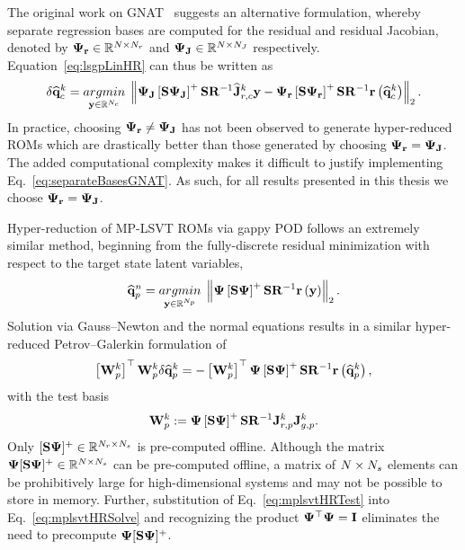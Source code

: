 %
The original work on GNAT~\cite{Carlberg2013} suggests an alternative formulation, whereby separate regression bases are computed for the residual and residual Jacobian, denoted by $\deimBasisRes \inRTwo{\numDOF}{\numResModes}$ and $\deimBasisJacob \inRTwo{\numDOF}{\numJacobModes}$ respectively. Equation~\ref{eq:lsgpLinHR} can thus be written as
%
\begin{equation}\label{eq:separateBasesGNAT}
    \delta \consVecCoef^{\newtonIdx} = \argmin{\dummyVec \inROne{\numConsModes}} \left\Vert \deimBasisJacob \left[ \sampMat \deimBasisJacob \right]^{+} \sampMat \resScaleInv \jacobResCoefCons^{\newtonIdx} \dummyVec - \deimBasisRes \left[ \sampMat \deimBasisRes \right]^{+} \sampMat \resScaleInv \resFunc{\consVecCoef^{\newtonIdx}} \right\Vert_2.
\end{equation}
%
In practice, choosing $\deimBasisRes \neq \deimBasisJacob$ has not been observed to generate hyper-reduced ROMs which are drastically better than those generated by choosing $\deimBasisRes = \deimBasisJacob$. The added computational complexity makes it difficult to justify implementing Eq.~\ref{eq:separateBasesGNAT}. As such, for all results presented in this thesis we choose $\deimBasisRes = \deimBasisJacob$.

Hyper-reduction of MP-LSVT ROMs via gappy POD follows an extremely similar method, beginning from the fully-discrete residual minimization with respect to the target state latent variables,
%
\begin{equation}
    \primVecCoef^{\timeIdx} = \argmin{\dummyVec \inROne{\numPrimModes}} \left\Vert \deimBasis \left[ \sampMat \deimBasis \right]^{+} \sampMat \resScaleInv \resFunc{\dummyVec} \right\Vert_2.
\end{equation}
%
Solution via Gauss--Newton and the normal equations results in a similar hyper-reduced Petrov--Galerkin formulation of
%
\begin{equation}\label{eq:mplsvtHRSolve}
    \left[ \testBasisPrim^\newtonIdx \right]^\top \testBasisPrim^\newtonIdx \delta \primVecCoef^{\newtonIdx} = -\left[\testBasisPrim^\newtonIdx \right]^\top \deimBasis \left[ \sampMat \deimBasis \right]^{+} \sampMat \resScaleInv \resFunc{\primVecCoef^{\newtonIdx}},
\end{equation}
%
with the test basis
%
\begin{equation}\label{eq:mplsvtHRTest}
    \testBasisPrim^\newtonIdx \defEq \deimBasis \left[ \sampMat \deimBasis \right]^{+} \sampMat \resScaleInv \jacobResPrim^{\newtonIdx} \jacobDecodePrim^{\newtonIdx}.
\end{equation}
%
Only $[ \sampMat \deimBasis ]^{+} \inRTwo{\numResModes}{\numSamps}$ is pre-computed offline. Although the matrix $\deimBasis [ \sampMat \deimBasis ]^{+} \inRTwo{\numDOF}{\numSamps}$ can be pre-computed offline, a matrix of $N \times N_s$ elements can be prohibitively large for high-dimensional systems and may not be possible to store in memory. Further, substitution of Eq.~\ref{eq:mplsvtHRTest} into Eq.~\ref{eq:mplsvtHRSolve} and recognizing the product $\deimBasis^\top \deimBasis = \identMat$ eliminates the need to precompute $\deimBasis [ \sampMat \deimBasis ]^{+}$.

